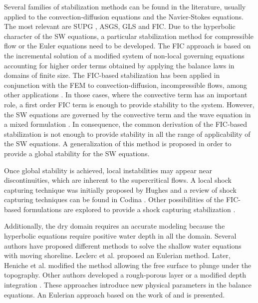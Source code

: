 Several families of stabilization methods can be found in the literature, usually applied to the convection-diffusion equations and the Navier-Stokes equations. The most relevant are SUPG \cite{brooks1982},
ASGS\cite{codina1998}, GLS \cite{hughes1989} and FIC\cite{onate1996,onate1998}.
Due to the hyperbolic character of the SW equations, a particular stabilization method for compressible flow or the Euler equations need to be developed.
The FIC approach is based on the incremental solution of a modified system of non-local governing equations accounting for higher order terms obtained by applying the balance laws in domains of finite size.
The FIC-based stabilization has been applied in conjunction with the FEM to convection-diffusion, incompressible flows, among other applications \cite{onate1998,onate2001}.
In those cases, where the convective term has an important role, a first order FIC term is enough to provide stability to the system.
However, the SW equations are governed by the convective term and the wave equation in a mixed formulation \cite{codina2008}. In consequence, the common derivation of the FIC-based stabilization is not enough to provide stability in all the range of applicability of the SW equations. 
A generalization of this method is proposed in order to provide a global stability for the SW equations.

Once global stability is achieved, local instabilities may appear near discontinuities, which are inherent to the supercritical flows.
A local shock capturing technique was initially proposed by Hughes \cite{hughes1986} and a review of shock capturing techniques can be found in Codina \cite{codina2011}.
Other possibilities of the FIC-based formulations are explored to provide a shock capturing stabilization \cite{cotela2016}.

Additionally, the dry domain requires an accurate modeling because the hyperbolic equations require positive water depth in all the domain.
Several authors have proposed different methods to solve the shallow water equations with moving shoreline. Leclerc et al. \cite{leclerc1990} proposed an Eulerian method. Later, Heniche et al. \cite{heniche2000} modified the method allowing the free surface to plunge under the topography.
Other authors developed a rough-porous layer \cite{candy2017,barros2011} or a modified depth integration \cite{defina2000}. These approaches introduce new physical parameters in the balance equations.
An Eulerian approach based on the work of \cite{leclerc1990} and \cite{heniche2000} is presented.




